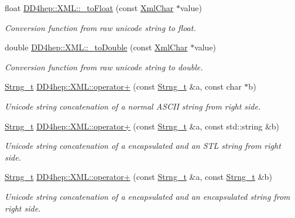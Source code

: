 \begin{DoxyCompactItemize}
float \hyperlink{group___d_d4_h_e_p___x_m_l_ga74d0ba6278b3baa645887da2151279ee}{D\+D4hep\+::\+X\+M\+L\+::\+\_\+to\+Float} (const \hyperlink{namespace_d_d4hep_1_1_x_m_l_a09e5d9cc86ed782f6826dfe0778c1815}{Xml\+Char} $\ast$value)
\begin{DoxyCompactList}\small\item\em Conversion function from raw unicode string to float. \end{DoxyCompactList}\item 
double \hyperlink{group___d_d4_h_e_p___x_m_l_gace8029e843a4c94cf50bd9adc32cd6f6}{D\+D4hep\+::\+X\+M\+L\+::\+\_\+to\+Double} (const \hyperlink{namespace_d_d4hep_1_1_x_m_l_a09e5d9cc86ed782f6826dfe0778c1815}{Xml\+Char} $\ast$value)
\begin{DoxyCompactList}\small\item\em Conversion function from raw unicode string to double. \end{DoxyCompactList}\item 
\hyperlink{class_d_d4hep_1_1_x_m_l_1_1_strng__t}{Strng\+\_\+t} \hyperlink{group___d_d4_h_e_p___x_m_l_gad7c5e5c9ad994b97f08eec6e7829e23f}{D\+D4hep\+::\+X\+M\+L\+::operator+} (const \hyperlink{class_d_d4hep_1_1_x_m_l_1_1_strng__t}{Strng\+\_\+t} \&a, const char $\ast$b)
\begin{DoxyCompactList}\small\item\em Unicode string concatenation of a normal A\+S\+C\+II string from right side. \end{DoxyCompactList}\item 
\hyperlink{class_d_d4hep_1_1_x_m_l_1_1_strng__t}{Strng\+\_\+t} \hyperlink{group___d_d4_h_e_p___x_m_l_gaf514b02eb314678df1b7149c4f0025b2}{D\+D4hep\+::\+X\+M\+L\+::operator+} (const \hyperlink{class_d_d4hep_1_1_x_m_l_1_1_strng__t}{Strng\+\_\+t} \&a, const std\+::string \&b)
\begin{DoxyCompactList}\small\item\em Unicode string concatenation of a encapsulated and an S\+TL string from right side. \end{DoxyCompactList}\item 
\hyperlink{class_d_d4hep_1_1_x_m_l_1_1_strng__t}{Strng\+\_\+t} \hyperlink{group___d_d4_h_e_p___x_m_l_ga16907b7f06827dc354d29834328834f8}{D\+D4hep\+::\+X\+M\+L\+::operator+} (const \hyperlink{class_d_d4hep_1_1_x_m_l_1_1_strng__t}{Strng\+\_\+t} \&a, const \hyperlink{class_d_d4hep_1_1_x_m_l_1_1_strng__t}{Strng\+\_\+t} \&b)
\begin{DoxyCompactList}\small\item\em Unicode string concatenation of a encapsulated and an encapsulated string from right side. \end{DoxyCompactList}\item 

\end{DoxyCompactItemize}
